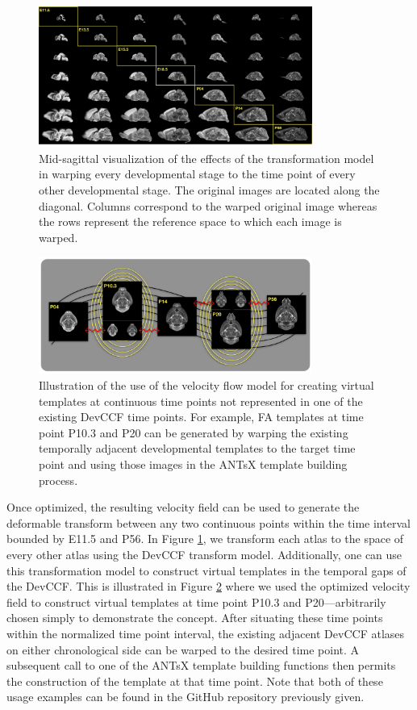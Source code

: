 \documentclass[
  12pt,
]{article}
\begin{document}
\begin{figure}[!htb]
\centering
\includegraphics[width=0.8\textwidth]{Figures/CrossWarp.pdf}
\caption{Mid-sagittal visualization of the effects of the transformation model in
warping every developmental stage to the time point of every other developmental
stage.  The original images are located along the diagonal.  Columns correspond
to the warped original image whereas the rows represent the reference space to which
each image is warped.}
\label{fig:crosswarp}
\end{figure}

\begin{figure}[!htb]
\centering
\includegraphics[width=0.8\textwidth]{Figures/pseudo_template.pdf}
\caption{Illustration of the use of the velocity flow model for creating virtual templates
at continuous time points not represented in one of the existing DevCCF time points.
For example, FA templates at time point P10.3 and P20 can be generated by warping the 
existing temporally adjacent developmental templates to the target time point and using 
those images in the ANTsX template building process.}
\label{fig:virtual}
\end{figure}

Once optimized, the resulting velocity field can be used to generate the
deformable transform between any two continuous points within the time
interval bounded by E11.5 and P56. In Figure \ref{fig:crosswarp}, we
transform each atlas to the space of every other atlas using the DevCCF
transform model. Additionally, one can use this transformation model to
construct virtual templates in the temporal gaps of the DevCCF. This is
illustrated in Figure \ref{fig:virtual} where we used the optimized
velocity field to construct virtual templates at time point P10.3 and
P20---arbitrarily chosen simply to demonstrate the concept. After
situating these time points within the normalized time point interval,
the existing adjacent DevCCF atlases on either chronological side can be
warped to the desired time point. A subsequent call to one of the ANTsX
template building functions then permits the construction of the
template at that time point. Note that both of these usage examples can
be found in the GitHub repository previously given.
\end{document}

